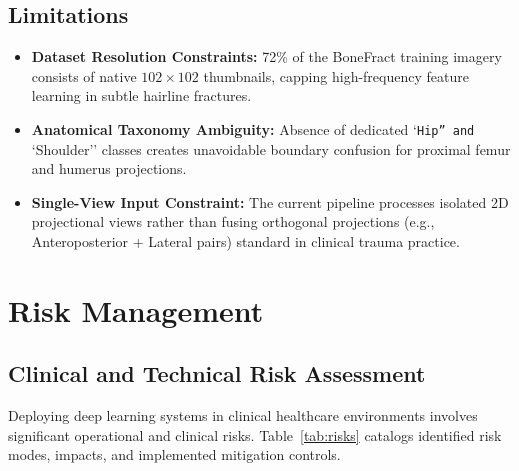 \documentclass[12pt, a4paper]{report}
\begin{document}
\section{Limitations}
\begin{itemize}[leftmargin=*]
    \item \textbf{Dataset Resolution Constraints:} 72\% of the BoneFract training imagery consists of native $102\times 102$ thumbnails, capping high-frequency feature learning in subtle hairline fractures.
    \item \textbf{Anatomical Taxonomy Ambiguity:} Absence of dedicated `\texttt{Hip'' and }`Shoulder'' classes creates unavoidable boundary confusion for proximal femur and humerus projections.
    \item \textbf{Single-View Input Constraint:} The current pipeline processes isolated 2D projectional views rather than fusing orthogonal projections (e.g., Anteroposterior + Lateral pairs) standard in clinical trauma practice.
\end{itemize}

\newpage
\chapter{Risk Management}

\section{Clinical and Technical Risk Assessment}
Deploying deep learning systems in clinical healthcare environments involves significant operational and clinical risks. Table~\ref{tab:risks} catalogs identified risk modes, impacts, and implemented mitigation controls.
\end{document}
